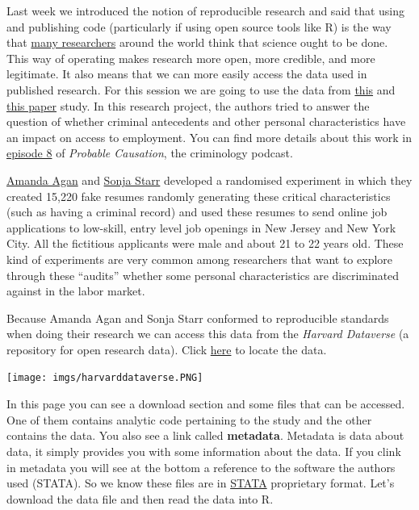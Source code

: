 \documentclass[
]{book}
\begin{document}
Last week we introduced the notion of reproducible research and said that using and publishing code (particularly if using open source tools like R) is the way that \href{https://osf.io/?gclid=EAIaIQobChMIq-jM6MuY2QIV7Z3tCh04vAycEAAYASAAEgLptPD_BwE}{many researchers} around the world think that science ought to be done. This way of operating makes research more open, more credible, and more legitimate. It also means that we can more easily access the data used in published research. For this session we are going to use the data from \href{https://academic.oup.com/qje/article/133/1/191/4060073}{this} and \href{https://pubs.aeaweb.org/doi/pdfplus/10.1257/aer.p20171003}{this paper} study. In this research project, the authors tried to answer the question of whether criminal antecedents and other personal characteristics have an impact on access to employment. You can find more details about this work in \href{https://www.probablecausation.com/podcasts/episode-8-amanda-agan}{episode 8} of \emph{Probable Causation}, the criminology podcast.

\href{http://economics.rutgers.edu/people/626-amanda-agan}{Amanda Agan} and \href{https://www.law.umich.edu/FacultyBio/Pages/FacultyBio.aspx?FacID=sbstarr}{Sonja Starr} developed a randomised experiment in which they created 15,220 fake resumes randomly generating these critical characteristics (such as having a criminal record) and used these resumes to send online job applications to low-skill, entry level job openings in New Jersey and New York City. All the fictitious applicants were male and about 21 to 22 years old. These kind of experiments are very common among researchers that want to explore through these ``audits'' whether some personal characteristics are discriminated against in the labor market.

Because Amanda Agan and Sonja Starr conformed to reproducible standards when doing their research we can access this data from the \emph{Harvard Dataverse} (a repository for open research data). Click \href{https://dataverse.harvard.edu/dataset.xhtml?persistentId=doi:10.7910/DVN/VPHMNT}{here} to locate the data.

\texttt{[image: imgs/harvarddataverse.PNG]}

In this page you can see a download section and some files that can be accessed. One of them contains analytic code pertaining to the study and the other contains the data. You also see a link called \textbf{metadata}. Metadata is data about data, it simply provides you with some information about the data. If you clink in metadata you will see at the bottom a reference to the software the authors used (STATA). So we know these files are in \href{https://www.stata.com/}{STATA} proprietary format. Let's download the data file and then read the data into R.
\end{document}

